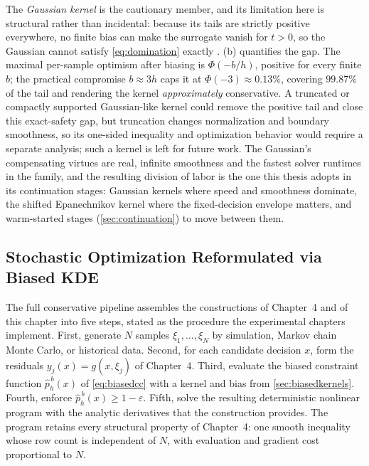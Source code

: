 The \emph{Gaussian kernel} is the cautionary member, and its limitation
here is structural rather than incidental: because its tails are
strictly positive everywhere, no finite bias can make the surrogate
vanish for $t > 0$, so the Gaussian cannot satisfy \cref{eq:domination}
exactly \citep{keil2021}. (b) quantifies the gap. The
maximal per-sample optimism after biasing is $\Phi(-b/h)$, positive for
every finite $b$; the practical compromise $b \approx 3h$ caps it at
$\Phi(-3) \approx 0.13\%$, covering $99.87\%$ of the tail and rendering
the kernel \emph{approximately} conservative. A truncated or compactly supported Gaussian-like kernel could remove the positive tail and close this exact-safety gap, but truncation changes normalization and boundary smoothness, so its one-sided inequality and optimization behavior would require a separate analysis; such a kernel is left for future work. The Gaussian's
compensating virtues are real, infinite smoothness and the fastest
solver runtimes in the family, and the resulting division of labor is
the one this thesis adopts in its continuation stages: Gaussian kernels
where speed and smoothness dominate, the shifted Epanechnikov kernel
where the fixed-decision envelope matters, and warm-started stages
(\cref{sec:continuation}) to move between them.

\subsection{Stochastic Optimization Reformulated via Biased KDE}
\label{sec:biasedreform}

The full conservative pipeline assembles the constructions of Chapter~4 and of this chapter into
five steps, stated as the procedure the experimental chapters
implement. First, generate $N$ samples $\xi_1,\dots,\xi_N$ by
simulation, Markov chain Monte Carlo, or historical data. Second, for each candidate decision $x$, form the residuals
$y_j(x) = g(x,\xi_j)$ of Chapter~4. Third, evaluate the biased
constraint function $\hat{p}_h^{\,b}(x)$ of \cref{eq:biasedcc} with a
kernel and bias from \cref{sec:biasedkernels}. Fourth, enforce
$\hat{p}_h^{\,b}(x) \geq 1-\varepsilon$. Fifth, solve the resulting
deterministic nonlinear program with the analytic derivatives that the
construction provides. The program retains every structural property of
Chapter~4: one smooth inequality whose row count is independent of $N$,
with evaluation and gradient cost proportional to $N$.

